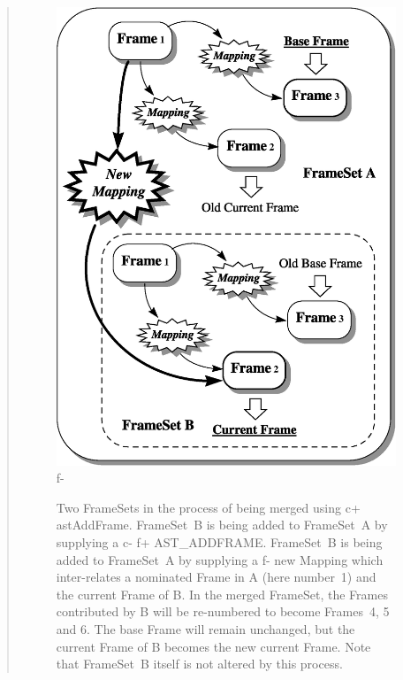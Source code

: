 \documentclass[twoside,11pt]{article}
\begin{document}
\begin{htmlonly}
\begin{quote}
\begin{figure}[hbtp]
   \includegraphics[scale=0.75]{sun210_figures/fsmerge.eps}
f-
   \caption{Two FrameSets in the process of being merged using
c+
   astAddFrame. FrameSet~B is being added to FrameSet~A by supplying a
c-
f+
   AST\_ADDFRAME. FrameSet~B is being added to FrameSet~A by supplying a
f-
   new Mapping which inter-relates a nominated Frame in A (here number~1)
   and the current Frame of B. In the merged FrameSet, the Frames
   contributed by B will be re-numbered to become Frames~4, 5 and 6. The
   base Frame will remain unchanged, but the current Frame of B becomes
   the new current Frame. Note that FrameSet~B itself is not
   altered by this process.}
   \end{figure}
   \end{quote}
\end{htmlonly}
\end{document}
